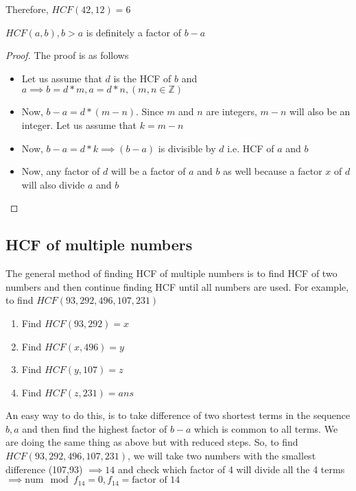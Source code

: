 Therefore, $HCF(42,12) = 6$

\begin{theorem}
    $HCF(a,b), b > a$ is definitely a factor of $b-a$
\end{theorem}

\begin{proof}
    The proof is as follows
    \begin{itemize}
        \item Let us assume that $d$ is the HCF of $b$ and $a \implies b = d * m, a = d *n, (m,n \in \mathbb{Z})$ 
        \item Now, $b-a = d * (m - n)$. Since $m$ and $n$ are integers, $m - n$ will also be an integer. Let us assume that $k = m -n $
        \item Now, $b - a = d * k \implies (b-a)$ is divisible by $d$ i.e. HCF of $a$ and $b$
        \item Now, any factor of $d$ will be a factor of $a$ and $b$ as well because a factor $x$ of $d$ will also divide $a$ and $b$
    \end{itemize}
\end{proof}

\subsection{HCF of multiple numbers}
The general method of finding HCF of multiple numbers is to find HCF of two numbers and then continue finding HCF until all numbers are used. For example, to find $HCF(93,292,496,107,231)$

\begin{enumerate}
    \item Find $HCF(93,292) = x$
    \item Find $HCF(x,496) = y$
    \item Find $HCF(y,107) = z$
    \item Find $HCF(z,231) = ans$
\end{enumerate}

An easy way to do this, is to take difference of two shortest terms in the sequence $b,a$ and then find the highest factor of $b - a$ which is common to all terms. We are doing the same thing as above but with reduced steps. So, to find $HCF(93,292,496,107,231)$, we will take two numbers with the smallest difference (107,93) $\implies 14$ and check which factor of 4 will divide all the 4 terms $\implies \text{num} \mod f_{14} = 0, f_{14} = \text{factor of 14}$

